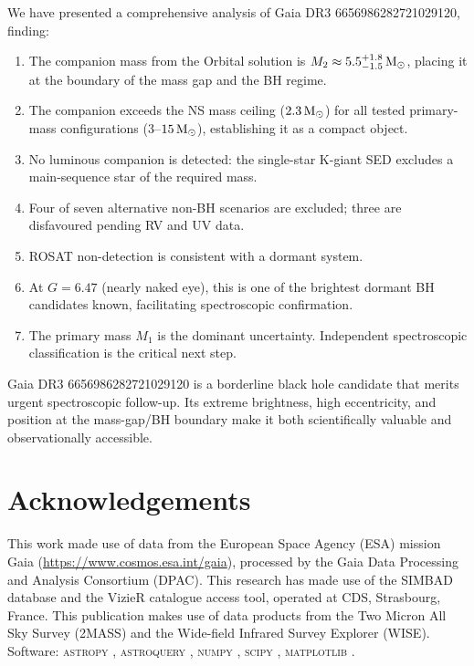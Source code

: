 \documentclass[usenatbib,fleqn]{mnras}
\newcommand{\Msun}{{\rm M}_\odot}
\begin{document}
We have presented a comprehensive analysis of Gaia DR3
6656986282721029120, finding:

\begin{enumerate}
\item The companion mass from the Orbital solution is
  $M_2 \approx 5.5^{+1.8}_{-1.5}\,\Msun$, placing it at the
  boundary of the mass gap and the BH regime.

\item The companion exceeds the NS mass ceiling ($2.3\,\Msun$) for
  all tested primary-mass configurations ($3$--$15\,\Msun$),
  establishing it as a compact object.

\item No luminous companion is detected: the single-star K-giant
  SED excludes a main-sequence star of the required mass.

\item Four of seven alternative non-BH scenarios are excluded;
  three are disfavoured pending RV and UV data.

\item ROSAT non-detection is consistent with a dormant system.

\item At $G = 6.47$ (nearly naked eye), this is one of the
  brightest dormant BH candidates known, facilitating
  spectroscopic confirmation.

\item The primary mass $M_1$ is the dominant uncertainty.
  Independent spectroscopic classification is the critical next
  step.
\end{enumerate}

Gaia DR3 6656986282721029120 is a borderline black hole
candidate that merits urgent spectroscopic follow-up.  Its extreme
brightness, high eccentricity, and position at the mass-gap/BH
boundary make it both scientifically valuable and observationally
accessible.

\section*{Acknowledgements}

This work made use of data from the European Space Agency (ESA)
mission Gaia (\url{https://www.cosmos.esa.int/gaia}), processed by
the Gaia Data Processing and Analysis Consortium (DPAC).
This research has made use of the SIMBAD database and the VizieR
catalogue access tool, operated at CDS, Strasbourg, France.
This publication makes use of data products from the Two Micron All
Sky Survey (2MASS) and the Wide-field Infrared Survey Explorer
(WISE).  Software: \textsc{astropy} \citep{Astropy2022},
\textsc{astroquery} \citep{Astroquery2019}, \textsc{numpy}
\citep{Harris2020}, \textsc{scipy} \citep{Virtanen2020},
\textsc{matplotlib} \citep{Hunter2007}.
\end{document}
